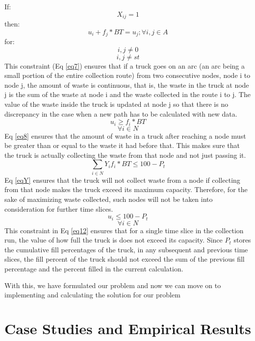 \documentclass[12pt]{article}
\begin{document}
If:
$$ X_{ij}=1$$
then:
\begin{equation}\label{eq7}
    u_i+f_j*BT =u_j ; \forall i,j \in A 
\end{equation}
for: 
$$ i,j\ne 0$$
$$ i,j \ne st $$
This constraint (Eq \eqref{eq7}) ensures that if a truck goes on an arc (an arc being a small portion of the entire collection route) from two consecutive nodes, node i to node j, the amount of waste is continuous, that is, the waste in the truck at node j is the sum of the waste at node i and the waste collected in the route i to j. The value of the waste inside the truck is updated at node j so that there is no discrepancy in the case when a new path has to be calculated with new data.
\begin{equation}\label{eq8}
    u_i\ge f_i*BT
\end{equation}
$$  \forall i\in N$$
Eq \eqref{eq8} ensures that the amount of waste in a truck after reaching a node must be greater than or equal to the waste it had before that. This makes sure that the truck is actually collecting the waste from that node and not just passing it.
\begin{equation}\label{eqY}
	\sum_{i\in N}Y_i f_i* BT\le100-P_t
\end{equation}
Eq \eqref{eqY} ensures that the truck will not collect waste from a node if collecting from that node makes the truck exceed its maximum capacity. Therefore, for the sake of maximizing waste collected, such nodes will not be taken into consideration for further time slices.
\begin{equation}\label{eq12}
    u_i\le 100 - P_t
\end{equation}
$$\forall i \in N $$
This constraint in Eq \eqref{eq12} ensures that for a single time slice in the collection run, the value of how full the truck is does not exceed its capacity. Since $P_t$ stores the cumulative fill percentages of the truck, in any subsequent and previous time slices, the fill percent of the truck should not exceed the sum of the previous fill percentage and the percent filled in the current calculation. 

With this, we have formulated our problem and now we can move on to implementing and calculating the solution for our problem

\section{Case Studies and Empirical Results}
\end{document}
